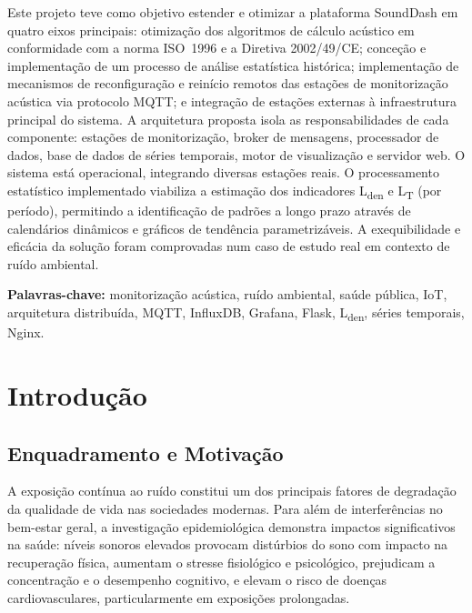 \documentclass[12pt,a4paper]{report}
\begin{document}
Este projeto teve como objetivo estender e otimizar a plataforma SoundDash em quatro eixos principais: otimização dos algoritmos de cálculo acústico em conformidade com a norma ISO~1996 e a Diretiva 2002/49/CE; conceção e implementação de um processo de análise estatística histórica; implementação de mecanismos de reconfiguração e reinício remotos das estações de monitorização acústica via protocolo MQTT; e integração de estações externas à infraestrutura principal do sistema. A arquitetura proposta isola as responsabilidades de cada componente: estações de monitorização, broker de mensagens, processador de dados, base de dados de séries temporais, motor de visualização e servidor web. O sistema está operacional, integrando diversas estações reais. O processamento estatístico implementado viabiliza a estimação dos indicadores L\textsubscript{den} e L\textsubscript{T} (por período), permitindo a identificação de padrões a longo prazo através de calendários dinâmicos e gráficos de tendência parametrizáveis. A exequibilidade e eficácia da solução foram comprovadas num caso de estudo real em contexto de ruído ambiental.

\textbf{Palavras-chave:} monitorização acústica, ruído ambiental, saúde pública, IoT, arquitetura distribuída, MQTT, InfluxDB, Grafana, Flask, L\textsubscript{den}, séries temporais, Nginx.

{\hypersetup{linkcolor=black}\tableofcontents}


\chapter{Introdução}

\section{Enquadramento e Motivação}

A exposição contínua ao ruído constitui um dos principais fatores de degradação da qualidade de vida nas sociedades modernas. Para além de interferências no bem-estar geral, a investigação epidemiológica demonstra impactos significativos na saúde: níveis sonoros elevados provocam distúrbios do sono com impacto na recuperação física, aumentam o stresse fisiológico e psicológico, prejudicam a concentração e o desempenho cognitivo, e elevam o risco de doenças cardiovasculares, particularmente em exposições prolongadas.
\end{document}
